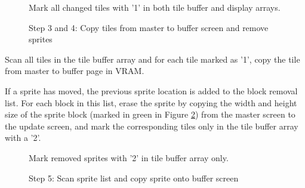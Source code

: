 \documentclass[book.tex]{subfiles}
\begin{document}
\begin{figure}[H]
\centering
 \caption{Mark all changed tiles with '1' in both tile buffer and display arrays.}
 \label{fig:kc1_3_update_refresh_img_1}
\end{figure}


\pagebreak

\begin{figure}[H]
\centering
 \caption{Step 3 and 4: Copy tiles from master to buffer screen and remove sprites}
 \label{fig:kc1_3_update_remove}
\end{figure}

Scan all tiles in the tile buffer array and for each tile marked as '1', copy the tile from master to buffer page in VRAM.\\
\par
If a sprite has moved, the previous sprite location is added to the block removal list. For each block in this list, erase the sprite by copying the width and height size of the sprite block (marked in green in Figure \ref{fig:kc1_3_update_remove}) from the master screen to the update screen, and mark the corresponding tiles only in the tile buffer array with a '2'.

\begin{figure}[H]
\centering
 \caption{Mark removed sprites with '2' in tile buffer array only.}
 \label{fig:kc1_3_update_remove_img_1}
\end{figure}


\pagebreak

\begin{figure}[H]
\centering
 \caption{Step 5: Scan sprite list and copy sprite onto buffer screen}
 \label{fig:kc1_3_update_sprite}
\end{figure}
\end{document}
